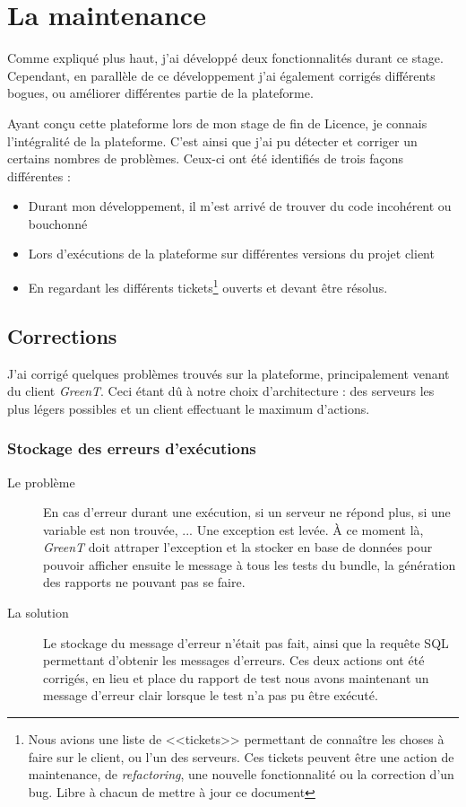 \section{La maintenance}
Comme expliqué plus haut, j'ai développé deux fonctionnalités durant ce stage. Cependant, en parallèle de ce développement j'ai également corrigés différents bogues, ou améliorer différentes partie de la plateforme.

Ayant conçu cette plateforme lors de mon stage de fin de Licence, je connais l'intégralité de la plateforme. C'est ainsi que j'ai pu détecter et corriger un certains nombres de problèmes. Ceux-ci ont été identifiés de trois façons différentes : 
\begin{itemize}
	\item Durant mon développement, il m'est arrivé de trouver du code incohérent ou bouchonné
	\item Lors d'exécutions de la plateforme sur différentes versions du projet client
	\item En regardant les différents tickets\footnote{Nous avions une liste de <<tickets>> permettant de connaître les choses à faire sur le client, ou l'un des serveurs. Ces tickets peuvent être une action de maintenance, de \textit{refactoring}, une nouvelle fonctionnalité ou la correction d'un bug. Libre à chacun de mettre à jour ce document} ouverts et devant être résolus.
\end{itemize}

\subsection{Corrections}
J'ai corrigé quelques problèmes trouvés sur la plateforme, principalement venant du client \textit{GreenT}. Ceci étant dû à notre choix d'architecture : des serveurs les plus légers possibles et un client effectuant le maximum d'actions.
	\subsubsection{Stockage des erreurs d'exécutions}
	\begin{description}
		\item[Le problème] En cas d'erreur durant une exécution, si un serveur ne répond plus, si une variable est non trouvée, ... Une exception est levée. À ce moment là, \textit{GreenT} doit attraper l'exception et la stocker en base de données pour pouvoir afficher ensuite le message à tous les tests du bundle, la génération des rapports ne pouvant pas se faire.
		\item[La solution] Le stockage du message d'erreur n'était pas fait, ainsi que la requête SQL permettant d'obtenir les messages d'erreurs. Ces deux actions ont été corrigés, en lieu et place du rapport de test nous avons maintenant un message d'erreur clair lorsque le test n'a pas pu être exécuté.
		\end{description}
		
